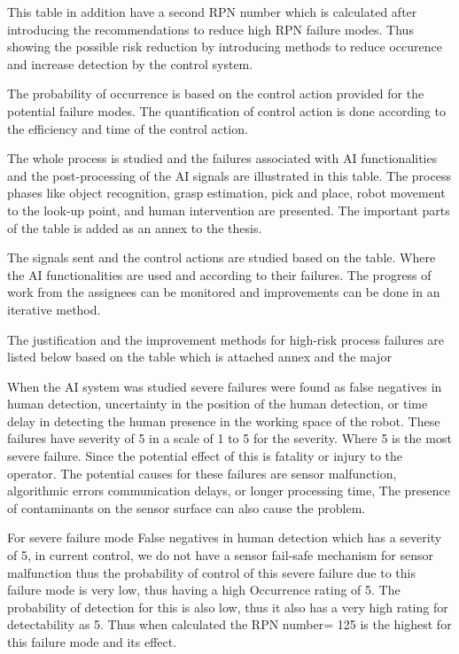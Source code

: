 {This table in addition have a second RPN number which is calculated after introducing the recommendations to reduce high RPN failure modes. Thus showing the possible risk reduction by introducing methods to reduce occurence and increase detection by the control system.

The probability of occurrence is based on the control action provided for the potential failure modes. The quantification of control action is done according to the efficiency and time of the control action.

The whole process is studied and the failures associated with AI functionalities and the post-processing of the AI signals are illustrated in this table. The process phases like object recognition, grasp estimation, pick and place, robot movement to the look-up point, and human intervention are presented. The important parts of the table is added as an annex to the thesis.

The signals sent and the control actions are studied based on the table. Where the AI functionalities are used and according to their failures.
The  progress of work from the assignees can be monitored and improvements can be done in an iterative method. 

The justification and the improvement methods for high-risk process failures are listed below based on the table which is attached annex and the major  

When the AI system was studied severe failures were found as false negatives in human detection, uncertainty in the position of the human detection, or time delay in detecting the human presence in the working space of the robot. These failures have severity of 5 in a scale of 1 to 5 for the severity. Where 5 is the most severe failure. Since the potential effect of this is fatality or injury to the operator. The potential causes for these failures are sensor malfunction, algorithmic errors communication delays, or longer processing time, The presence of contaminants on the sensor surface can also cause the problem.

For severe failure mode False negatives in human detection which has a severity of 5,
in current control, we do not have a sensor fail-safe mechanism for sensor malfunction thus the probability of control of this severe failure due to this failure mode is very low, thus having a high Occurrence rating of 5.  The probability of detection for this is also low, thus it also has a very high rating for detectability as 5. Thus when calculated the RPN number= 125 is the highest for this failure mode and its effect.

}
